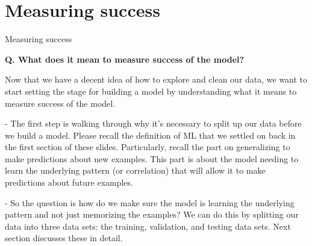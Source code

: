 \section{Measuring success}
\begin{transitionframe}
  \begin{center}
    \Huge Measuring success
  \end{center}
\end{transitionframe}

\begin{frame}[fragile, label={distance}]{\textbf{Q. What does it mean to measure success of the model?}}
  \begin{wideitemize}
    \item Now that we have a decent idea of how to explore and clean our data, we want to start
    setting the stage for building a model by understanding what it means to measure success of
    the model.
    \begin{wideitemize}
      \item[-] The first step is walking through why it's necessary to split up our data before
      we build a model. Please recall the definition of ML that we settled on back in the first
      section of these slides. Particularly, recall the part on generalizing to make predictions
      about new examples. This part is about the model needing to learn the underlying pattern
      (or correlation) that will allow it to make predictions about future examples.
      \item[-] So the question is how do we make sure the model is learning the underlying pattern
      and not just memorizing the examples? We can do this by splitting our data into three data sets:
      the training, validation, and testing data sets. Next section discusses these in detail.
    \end{wideitemize}
  \end{wideitemize}
\end{frame}


